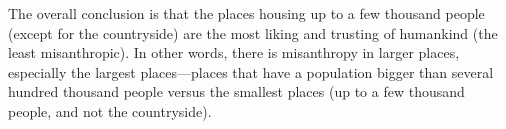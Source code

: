 \documentclass[11pt, letterpaper]{article}
\begin{document}
\begin{spacing}{1.4}
 The overall conclusion is that the places housing up to a few thousand people
 (except for the countryside) are the most liking and trusting of humankind (the least
 misanthropic). In other words, there is misanthropy in larger places,
 especially the largest places---places that have a population bigger than
 several hundred thousand people versus the smallest places (up to a few thousand people, and not the countryside).







 



\end{spacing}
\end{document}
